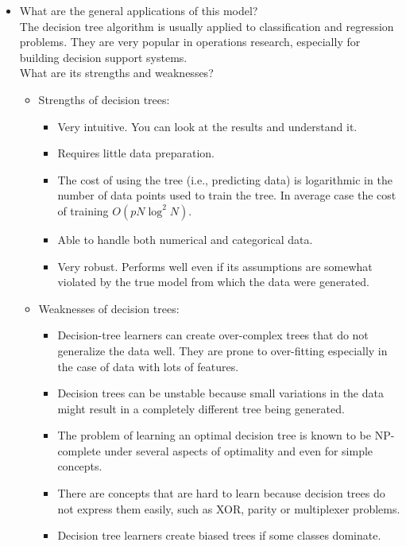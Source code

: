 \documentclass[12pt]{article}
\begin{document}
\begin{itemize}
\item What are the general applications of this model?\\
The decision tree algorithm is usually applied to classification and regression problems. They are very popular in operations research, especially for building decision support systems. \\
What are its strengths and weaknesses?\\  
       \begin{itemize}
       \item Strengths of decision trees:
              \begin{itemize}[noitemsep,nolistsep]
                     \item Very intuitive. You can look at the results and understand it. 
                     \item Requires little data preparation. 
                     \item The cost of using the tree (i.e., predicting data) is logarithmic in the number of data points used to train the tree. In average case the cost of training $ O(pN\log^2 N)$.
                     \item Able to handle both numerical and categorical data.
                     \item Very robust. Performs well even if its assumptions are somewhat violated by the true model from which the data were generated.
              \end{itemize}
       \item Weaknesses of decision trees:
              \begin{itemize}[noitemsep,nolistsep]
                     \item Decision-tree learners can create over-complex trees that do not generalize the data well. They are prone to over-fitting especially in the case of data with lots of features.
                     \item Decision trees can be unstable because small variations in the data might result in a completely different tree being generated. 
                     \item The problem of learning an optimal decision tree is known to be NP-complete under several aspects of optimality and even for simple concepts. 
                     \item There are concepts that are hard to learn because decision trees do not express them easily, such as XOR, parity or multiplexer problems.
                     \item Decision tree learners create biased trees if some classes dominate. 
              \end{itemize}
       \end{itemize}



\end{itemize}
\end{document}
